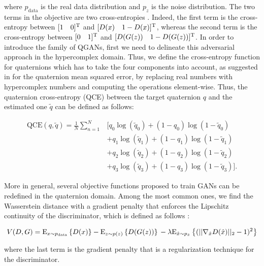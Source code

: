 \documentclass[graybox]{svmult}
\begin{document}
\noindent where $p_{\text{data}}$ is the real data distribution and $p_z$ is the noise distribution. The two terms in the objective are two cross-entropies \cite{Gui2020ARO}. Indeed, the first term is the cross-entropy between $[1 \quad 0]^{\text{T}}$ and $[D(x) \quad 1-D(x)]^{\text{T}}$, whereas the second term is the cross-entropy between $[0 \quad 1]^{\text{T}}$ and $[D(G(z)) \quad 1-D(G(z))]^{\text{T}}$. 
In order to introduce the family of QGANs, first we need to delineate this adversarial approach in the hypercomplex domain. Thus, we define the cross-entropy function for quaternions which has to take the four components into account, as suggested in \cite{ParcolletAIR2019} for the quaternion mean squared error, by replacing real numbers with hypercomplex numbers and computing the operations element-wise. Thus, the quaternion cross-entropy (QCE) between the target quaternion $q$ and the estimated one $\tilde{q}$ can be defined as follows:

\begin{equation}
\label{eq:q_ce}
    \begin{split}
    \text{QCE}(q, \tilde{q}) = \frac{1}{N} \sum_{n=1}^{N} &\big[ q_0\log(\tilde{q}_0) + (1-q_0) \log(1-\tilde{q}_0) \\
    &+ q_1\log(\tilde{q}_1) + (1-q_1) \log(1-\tilde{q}_1) \\
    &+ q_2\log(\tilde{q}_2) + (1-q_2) \log(1-\tilde{q}_2) \\
    &+ q_3\log(\tilde{q}_3) + (1-q_3) \log(1-\tilde{q}_3) \big].
    \end{split}
\end{equation}

More in general, several objective functions proposed to train GANs can be redefined in the quaternion domain.
Among the most common ones, we find the Wasserstein distance with a gradient penalty that enforces the Lipschitz continuity of the discriminator, which is defined as follows \cite{Arjovsky2017WassersteinG, GulrajaniNIPS2017}: 

\begin{equation}
\label{eq:wgan}
    V(D,G) = \text{E}_{x\sim p_{\text{data}}}\left\{D(x)\right\} - \text{E}_{z\sim p(z)}\left\{D(G(z))\right\} \\
    - \lambda \text{E}_{\hat{x}\sim p_{\hat{x}}} \left\{(||\nabla_{\hat{x}}D({\hat{x}})||_2-1)^2\right\}
\end{equation}

\noindent where the last term is the gradient penalty that is a regularization technique for the discriminator.
\end{document}
